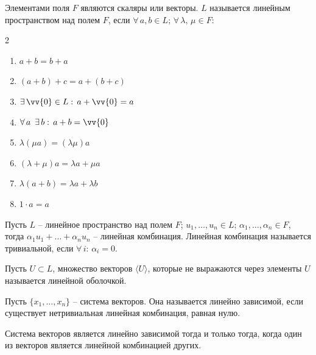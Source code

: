 \documentclass[12pt]{article}
\begin{document}
\begin{definition}
    Элементами поля $F$ являются скаляры или векторы. $L$ называется линейным пространством над полем $F$, если $\forall\,a,b\in L;\,\forall\,\lambda,\,\mu \in F$:
    \begin{center}
        \begin{multicols}{2}
            \begin{enumerate}
                \item $a+b=b+a$\\
                \item $(a+b)+c=a+(b+c)$\\
                \item $\exists\,\vv{0}\in L:\,a+\vv{0}=a$\\
                \item $\forall\,a\enspace  \exists\,b:\,a+b=\vv{0}$\\
                \item $\lambda(\mu a)=(\lambda \mu)a$\\
                \item $(\lambda+\mu)a=\lambda a + \mu a$\\
                \item $\lambda(a+b)=\lambda a+ \lambda b$\\
                \item $1\cdot a = a$
            \end{enumerate}
        \end{multicols}
    \end{center}
\end{definition}
\begin{definition}
    Пусть $L$ – линейное пространство над полем $F$; $u_1,\ldots,u_n\in L;\,\alpha_1,\ldots,\alpha_n\in F$, тогда $\alpha_1u_1+\ldots+\alpha_nu_n$ – линейная комбинация. Линейная комбинация называется тривиальной, если $\forall\,i:\,\alpha_i=0$.
\end{definition}
\begin{definition}
    Пусть $U\subset L$, множество векторов $\langle U\rangle$, которые не выражаются через элементы $U$ называется линейной оболочкой.
\end{definition}
\begin{definition}
    Пусть $\{x_1,\ldots,x_n\}$ – система векторов. Она называется линейно зависимой, если существует нетривиальная линейная комбинация, равная нулю.
\end{definition}
\begin{theorem}
    Система векторов является линейно зависимой тогда и только тогда, когда один из векторов является линейной комбинацией других.
\end{theorem}
\end{document}

